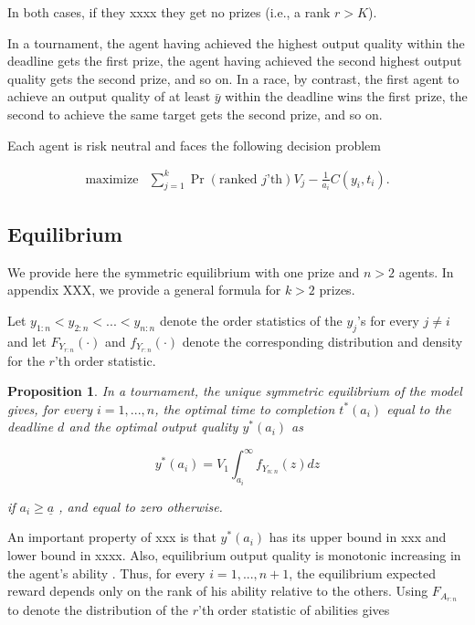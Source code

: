 \documentclass[12pt,]{article}
\newtheorem{proposition}{Proposition}
\begin{document}
In both cases, if they xxxx they get no prizes (i.e., a rank \(r > K\)).

In a tournament, the agent having achieved the highest output quality
within the deadline gets the first prize, the agent having achieved the
second highest output quality gets the second prize, and so on. In a
race, by contrast, the first agent to achieve an output quality of at
least \({\bar y}\) within the deadline wins the first prize, the second
to achieve the same target gets the second prize, and so on.

Each agent is risk neutral and faces the following decision problem

\[\begin{array}{ll}
    \mbox{maximize} & \sum_{j=1}^k \Pr(\text{ranked $j$'th}) V_j  - \frac{1}{a_i} C(y_i, t_i).
  \end{array}\]

\subsection{Equilibrium}\label{equilibrium}

We provide here the symmetric equilibrium with one prize and \(n>2\)
agents. In appendix XXX, we provide a general formula for \(k>2\)
prizes.

Let \(y_{1:n} < y_{2:n} < ... < y_{n:n}\) denote the order statistics of
the \(y_j\)'s for every \(j\neq i\) and let \({F_{Y_{r:n}}}(\cdot)\) and
\({f_{Y_{r:n}}}(\cdot)\) denote the corresponding distribution and
density for the \(r\)'th order statistic.

\begin{proposition}

In a tournament, the unique symmetric equilibrium of the model gives,
for every \(i=1, ..., n\), the optimal time to completion \(t^*(a_i)\)
equal to the deadline \(d\) and the optimal output quality \(y^*(a_i)\)
as

\[\label{eq: optimal bid tournament}
  y^*(a_i) =  V_1 \int_{a_i}^\infty {f_{Y_{n:n}}} (z) dz\]

if \({a_i}\geq {\underline a}\) \citep[see][]{moldovanu2001optimal}, and
equal to zero otherwise.

\end{proposition}

An important property of xxx is that \(y^*(a_i)\) has its upper bound in
xxx and lower bound in xxxx. Also, equilibrium output quality is
monotonic increasing in the agent's ability
\citep[see][]{moldovanu2001optimal}. Thus, for every \(i=1, ..., n+1\),
the equilibrium expected reward depends only on the rank of his ability
relative to the others. Using \({F_{A_{r:n}}}\) to denote the
distribution of the \(r\)'th order statistic of abilities gives
\end{document}
